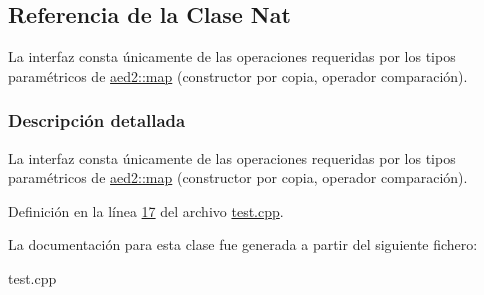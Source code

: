 \hypertarget{classNat}{}\subsection{Referencia de la Clase Nat}
\label{classNat}


La interfaz consta únicamente de las operaciones requeridas por los tipos paramétricos de \hyperlink{classaed2_1_1map}{aed2\+::map} (constructor por copia, operador comparación).  




\subsubsection{Descripción detallada}
La interfaz consta únicamente de las operaciones requeridas por los tipos paramétricos de \hyperlink{classaed2_1_1map}{aed2\+::map} (constructor por copia, operador comparación). 

Definición en la línea \hyperlink{test_8cpp_source_l00017}{17} del archivo \hyperlink{test_8cpp_source}{test.\+cpp}.



La documentación para esta clase fue generada a partir del siguiente fichero\+:\begin{DoxyCompactItemize}
\item 
test.\+cpp\end{DoxyCompactItemize}
